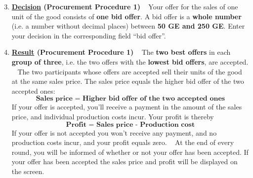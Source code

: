 \documentclass[11pt]{scrartcl}
\begin{document}
\begin{enumerate}[label=\textbf{\upshape(\arabic*\upshape)}] \setcounter{enumi}{2}
	\item \textbf{\underline{Decision} (Procurement Procedure 1)} ~\smallbreak
		Your offer for the sales of one unit of the good consists of \textbf{one bid offer}. A bid offer is a \textbf{whole number} (i.e. a number without decimal places) between \textbf{50 GE and 250 GE}. Enter your decision in the corresponding field \enquote{bid offer}.
	\item \textbf{\underline{Result} (Procurement Procedure 1)} ~\smallbreak
		The \textbf{two best offers} in each \textbf{group of three}, i.e. the two offers with the \textbf{lowest bid offers}, are accepted. ~\smallbreak
		The two participants whose offers are accepted sell their units of the good at the same sales price. The sales price equals the higher bid offer of the two accepted ones:
			$$ \textbf{Sales price = Higher bid offer of the two accepted ones}  $$
		If your offer is accepted, you’ll receive a payment in the amount of the sales price, and individual production costs incur. Your profit is thereby
			$$ \textbf{Profit = Sales price - Production cost} $$
		If your offer is not accepted you won’t receive any payment, and no production costs incur, and your profit equals zero. ~\smallbreak
		At the end of every round, you will be informed of whether or not your offer has been accepted. If your offer has been accepted the sales price and profit will be displayed on the screen.
\end{enumerate}
\end{document}
